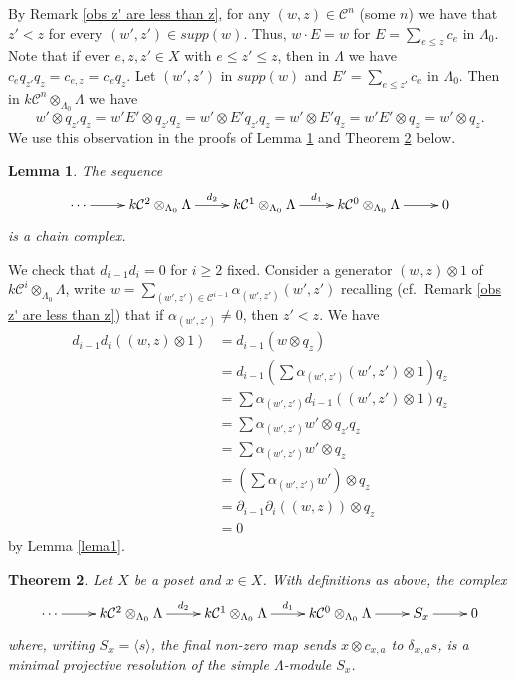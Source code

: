 \documentclass[preprint,review,12pt]{elsarticle}
\newcommand{\C}{{\mathcal C}}
\newtheorem{teo}{Theorem}
\newtheorem{lema}[teo]{Lemma}
\begin{document}
By Remark \ref{obs z' are less than z}, for any $(w,z)\in \C^n$ (some $n$) we have that $z'<z$ for every $(w',z') \in supp(w)$. Thus, $w\cdot E = w$ for $E=\sum_{e\leqslant z} c_e$ in $\Lambda_0$. Note that if ever $e,z,z'\in X$ with $e\leqslant z'\leqslant z$, then in $\Lambda$ we have $c_eq_{z'}q_z = c_{e,z} = c_eq_z$. Let $(w',z')$ in $supp(w)$ and $E'=\sum_{e\leqslant z'} c_e$ in $\Lambda_0$. Then in $k\mathcal{C}^n\otimes_{\Lambda_0}\Lambda$ we have
    $$w'\otimes q_{z'}q_z = w'E'\otimes q_{z'}q_z = w'\otimes E'q_{z'}q_z = w'\otimes E'q_z = w'E'\otimes q_z = w'\otimes q_z.$$
We use this observation in the proofs of Lemma \ref{lemma ds give complex} and Theorem \ref{projectiveresolution} below.
\begin{lema}\label{lemma ds give complex}
The sequence
	$$\xymatrix@R=0.8em{ \cdots \ar[r] & k\C^2\otimes_{\Lambda_0}\Lambda\ar[r]^-{d_2} & k\C^{1}\otimes_{\Lambda_0}\Lambda\ar[r]^-{d_{1}} & k\C^{0}\otimes_{\Lambda_0}\Lambda\ar[r] & 0}$$
is a chain complex.
\end{lema}

\begin{pf}
We check that $d_{i-1}d_i = 0$ for $i\geqslant 2$ fixed.  Consider a generator $(w,z)\otimes 1$ of $k\C^i\otimes_{\Lambda_0} \Lambda$, write $w = \sum_{(w',z')\in \C^{i-1}} \alpha_{(w',z')}(w',z')$ recalling (cf.\ Remark \ref{obs z' are less than z}) that if $\alpha_{(w',z')}\neq 0$, then $z'<z$.  We have
\begin{align*}
d_{i-1}d_i((w,z)\otimes 1) & = d_{i-1}(w\otimes q_z) \\
					       & = d_{i-1}(\sum\alpha_{(w',z')}(w',z')\otimes 1)q_z \\
            			   & = \sum\alpha_{(w',z')}d_{i-1}((w',z')\otimes 1)q_z \\
            			   & = \sum\alpha_{(w',z')}w'\otimes q_{z'}q_z \\
            			   & = \sum\alpha_{(w',z')}w'\otimes q_z \\
            			   & = (\sum\alpha_{(w',z')}w')\otimes q_z \\
            			   & = \partial_{i-1}\partial_i((w,z))\otimes q_z \\
            			   & = 0
\end{align*}
by Lemma \ref{lema1}.
\end{pf}

\begin{teo}\label{projectiveresolution}
Let $X$ be a poset and $x\in X$. With definitions as above, the complex
	$$\xymatrix@R=0.8em{ \cdots \ar[r] & k\C^2\otimes_{\Lambda_0}\Lambda\ar[r]^-{d_2} & k\C^{1}\otimes_{\Lambda_0}\Lambda\ar[r]^-{d_{1}} & k\C^{0}\otimes_{\Lambda_0}\Lambda\ar[r] & S_x\ar[r] & 0}$$
where, writing $S_x = \langle s\rangle$, the final non-zero map sends $x\otimes c_{x,a}$ to $\delta_{x,a}s$, is a minimal projective resolution of the simple $\Lambda$-module $S_x$.
\end{teo}
	
\end{document}
